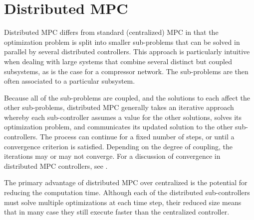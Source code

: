 \section{Distributed MPC}
\label{sec:intro:mpc}

Distributed MPC differs from standard (centralized) MPC in that the optimization problem is split into smaller sub-problems that can be solved in parallel by several distributed controllers.
This approach is particularly intuitive when dealing with large systems that combine several distinct but coupled subsystems, as is the case for a compressor network.
The sub-problems are then often associated to a particular subsystem.

Because all of the sub-problems are coupled, and the solutions to each affect the other sub-problems, distributed MPC generally takes an iterative approach whereby each sub-controller assumes a value for the other solutions, solves its optimization problem, and communicates its updated solution to the other sub-controllers.
The process can continue for a fixed number of steps, or until a convergence criterion is satisfied.
Depending on the degree of coupling, the iterations may or may not converge. For a discussion of convergence in distributed MPC controllers, see \cite{Stewart2010}.

The primary advantage of distributed MPC over centralized is the potential for reducing the computation time.
Although each of the distributed sub-controllers must solve multiple optimizations at each time step, their reduced size means that in many case they still execute faster than the centralized controller.

